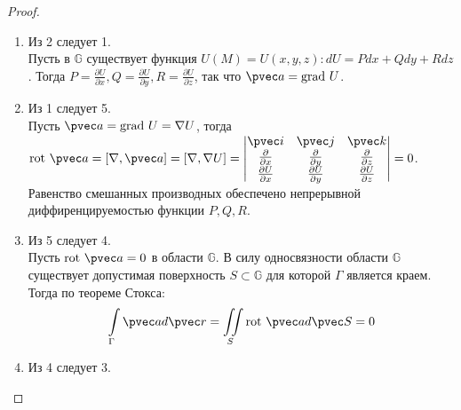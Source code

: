 \begin{proof}
  \begin{enumerate}
    \item Из 2 следует 1. \\

      Пусть в $\mathbb{G}$ существует функция $U(M) = U(x, y, z): dU = Pdx +
      Qdy + Rdz$. Тогда $P = \frac{\partial U}{\partial x}, Q = \frac{\partial
      U}{\partial y}, R = \frac{\partial U}{\partial z}$, так что $\pvec a =
      \mbox{grad} \ U$.
    \item Из 1 следует 5. \\

      Пусть $\pvec a = \mbox{grad} \ U = \nabla U$, тогда $\mbox{rot} \ \pvec a
      = [\nabla, \pvec a] = [\nabla, \nabla U] = \begin{vmatrix}
        \pvec i & \pvec j & \pvec k \\
        \frac{\partial }{\partial x} & \frac{\partial }{\partial y} &
        \frac{\partial }{\partial z} \\
        \frac{\partial U}{\partial x} & \frac{\partial U}{\partial y} &
        \frac{\partial U}{\partial z}
      \end{vmatrix} = 0$. Равенство смешанных производных обеспечено
      непрерывной диффиренцируемостью функции $P, Q, R$.
    \item Из 5 следует 4. \\

      Пусть $\mbox{rot} \ \pvec a = 0$ в области $\mathbb{G}$. В силу
      односвязности области $\mathbb{G}$ существует допустимая поверхность $S
      \subset \mathbb{G}$ для которой $\Gamma$ является краем. Тогда по теореме
      Стокса:
      \begin{gather*}
        \int\limits_{\Gamma} \pvec a d \pvec r = \iint\limits_S \mbox{rot} \
        \pvec a d \pvec S = 0
      \end{gather*}
    \item Из 4 следует 3. \\


\end{enumerate}
\end{proof}
